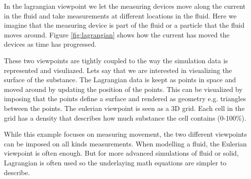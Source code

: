 In the lagrangian viewpoint we let the measuring devices move along
the current in the fluid and take measurements at different locations
in the fluid. Here we imagine that the measuring device is part of the
fluid or a particle that the fluid moves around. Figure
\ref{fig:lagrangian} shows how the current has moved the devices as
time has progressed.

These two viewpoints are tightly coupled to the way the simulation data
is represented and visuliazed. Lets say that we are interested in
visualizing the surface of the substance.
%
The Lagrangian data is keept as points in space and moved around by
updating the position of the points. This can be visualized by
imposing that the points define a surface and rendered as geometry
e.g. triangles between the points.
%
The eulerian viewpoint is seen as a 3D grid. Each cell in the grid has
a density that describes how much substance the cell contains (0-100\%).

While this example focuses on measuring movement, the two different
viewpoints can be imposed on all kinds measurements.
%
When modelling a fluid, the Eulerian viewpoint is often
enough. But for more advanced simulations of fluid or solid,
Lagrangian is often used so the underlaying math equations are simpler
to describe.







